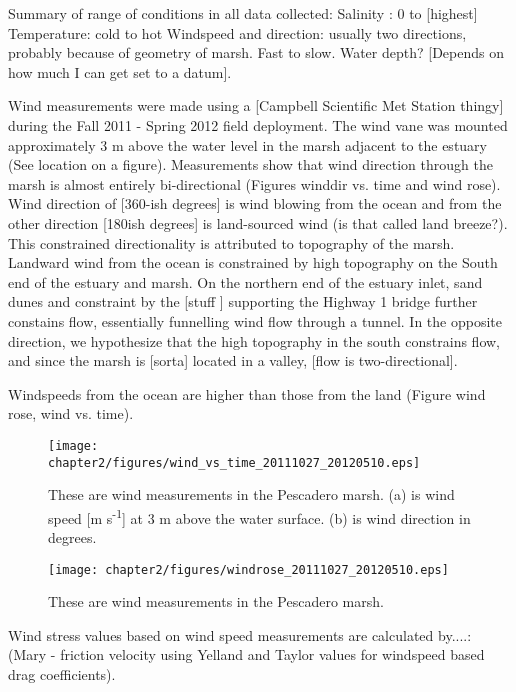 Summary of range of conditions in all data collected:
Salinity : 0 to [highest]
Temperature: cold to hot
Windspeed and direction: usually two directions, probably because of geometry of marsh. Fast to slow. 
Water depth? [Depends on how much I can get set to a datum]. 



Wind measurements were made using a [Campbell Scientific Met Station thingy] during the Fall 2011 - Spring 2012 field deployment. The wind vane was mounted approximately 3 m above the water level in the marsh adjacent to the estuary (See location on a figure).  Measurements show that wind direction through the marsh is almost entirely bi-directional (Figures winddir vs. time and wind rose). Wind direction of [360-ish degrees] is wind blowing from the ocean and from the other direction [180ish degrees] is land-sourced wind (is that called land breeze?). This constrained directionality is attributed to topography of the marsh.  Landward wind from the ocean is constrained by high topography on the South end of the estuary and marsh. On the northern end of the estuary inlet, sand dunes and constraint by the [stuff ] supporting the Highway 1 bridge further constains flow, essentially funnelling wind flow through a tunnel.  In the opposite direction, we hypothesize that the high topography in the south constrains flow, and since the marsh is [sorta] located in a valley, [flow is two-directional]. 

Windspeeds from the ocean are higher than those from the land (Figure wind rose, wind vs. time). 

\begin{figure}
  \texttt{[image: chapter2/figures/wind\_vs\_time\_20111027\_20120510.eps]}
    \caption{These are wind measurements in the Pescadero marsh. (a) is wind speed [m s\textsuperscript{-1}] at 3 m above the water surface. (b) is wind direction in degrees.}
 \label{metstn_pdo_ws_wdir}
 \end{figure}
 
 \begin{figure}
  \texttt{[image: chapter2/figures/windrose\_20111027\_20120510.eps]}
    \caption{These are wind measurements in the Pescadero marsh.}
 \label{metstn_pdo_windrose}
 \end{figure}


Wind stress values based on wind speed measurements are calculated by....:  (Mary - friction velocity using Yelland and Taylor values for windspeed based drag coefficients). 

